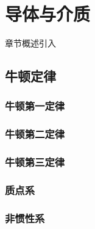 \chapter{导体与介质}\label{3}

章节概述引入

\section{牛顿定律}\label{3-1}

\subsection{牛顿第一定律}\label{3-1-1}

\subsection{牛顿第二定律}\label{3-1-2}

\subsection{牛顿第三定律}\label{3-1-3}

\subsection{质点系}\label{3-1-4}

\subsection{非惯性系}\label{3-1-5}